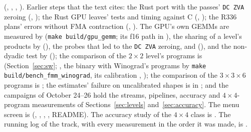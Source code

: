 \documentclass[11pt]{article}
\begin{document}
{(, ,
, ).  Earlier steps that the text cites: the Rust
port with the passes' \texttt{DC~ZVA} zeroing
(, ); the Rust
GPU leaves' tests and timing against C (,
); the R336 plans' errors without FMA
contraction (,
).  The GPU's own GEMMs are measured by 
(\texttt{make build/gpu\_gemm}; its f16 path in
), the sharing of a level's products by
 (), the probes that led to the
\texttt{DC~ZVA} zeroing,  and 
(), and the non-dyadic test by
 (); the comparison
of the $2\times2$ level's programs is 
(Section~\ref{sec:sw}; , the binary with Winograd's
programs by \texttt{make build/bench\_fmm\_winograd}, its calibration
,
); the comparison of the
$3\times3\times6$ programs is ;
the estimates' failure on uncalibrated shapes is in
; and the campaigns of October 24--26 hold the
streams, pipelines, accuracy and $4\times4$-program measurements of
Sections~\ref{sec:levels} and~\ref{sec:accuracy}.  The menu screen is 
(, , ,
, README).  The accuracy study of the $4\times4$ class
is  \cite{S26b}.  The running
log of the track, with every measurement in the order it was made, is
.\par}
\end{document}
